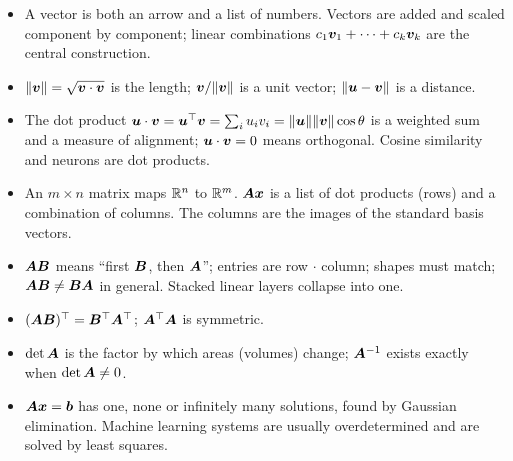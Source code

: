 \begin{keytakeaways}
\begin{itemize}
  \item A vector is both an arrow and a list of numbers. Vectors are added and
    scaled component by component; linear combinations
    $c_1\bm{v}_1 + \dots + c_k\bm{v}_k$ are the central construction.
  \item $\lVert\bm{v}\rVert = \sqrt{\bm{v}\cdot\bm{v}}$ is the length; $\bm{v}/\lVert\bm{v}\rVert$ is a unit
    vector; $\lVert\bm{u} - \bm{v}\rVert$ is a distance.
  \item The dot product $\bm{u}\cdot\bm{v} = \bm{u}^\top\bm{v} = \sum_i u_iv_i =
    \lVert\bm{u}\rVert\lVert\bm{v}\rVert\cos\theta$ is a weighted sum and a measure of
    alignment; $\bm{u}\cdot\bm{v} = 0$ means orthogonal. Cosine similarity and
    neurons are dot products.
  \item An $m\times n$ matrix maps $\mathbb{R}^n$ to $\mathbb{R}^m$. $\bm{A}\bm{x}$ is a list of dot
    products (rows) and a combination of columns. The columns are the images
    of the standard basis vectors.
  \item $\bm{A}\bm{B}$ means ``first $\bm{B}$, then $\bm{A}$''; entries are row $\cdot$
    column; shapes must match; $\bm{A}\bm{B} \neq \bm{B}\bm{A}$ in general. Stacked linear
    layers collapse into one.
  \item $(\bm{A}\bm{B})^\top = \bm{B}^\top\bm{A}^\top$; $\bm{A}^\top\bm{A}$ is symmetric.
  \item $\det\bm{A}$ is the factor by which areas (volumes) change;
    $\bm{A}^{-1}$ exists exactly when $\det\bm{A} \neq 0$.
  \item $\bm{A}\bm{x} = \bm{b}$ has one, none or infinitely many solutions, found by
    Gaussian elimination. Machine learning systems are usually overdetermined
    and are solved by least squares.
\end{itemize}
\end{keytakeaways}

